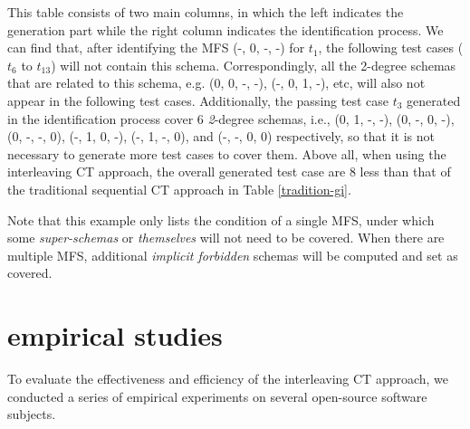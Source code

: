 \documentclass{sig-alternate}
\begin{document}
This table consists of two main columns, in which the left indicates the generation part while the right column indicates the identification process. We can find that, after identifying the MFS (-, 0, -, -) for $t_{1}$, the following test cases ($t_{6}$ to $t_{13}$) will not contain this schema. Correspondingly, all the 2-degree schemas that are related to this schema, e.g. (0, 0, -, -), (-, 0, 1, -), etc, will also not appear in the following test cases. Additionally, the passing test case $t_{3}$ generated in the identification process cover 6 \emph{2}-degree schemas, i.e., (0, 1, -, -), (0, -, 0, -), (0, -, -, 0), (-, 1, 0, -), (-, 1, -, 0), and (-, -, 0, 0) respectively, so that it is not necessary to generate more test cases to cover them.  Above all, when using the interleaving CT approach,  the overall generated test case are 8 less than that of the traditional sequential CT approach in Table \ref{tradition-gi}.

Note that this example only lists the condition of a single MFS, under which some \emph{super-schemas} or \emph{themselves} will not need to be covered.  When there are multiple MFS, additional \emph{implicit forbidden} schemas will be computed and set as covered.



%
%

\section{empirical studies}
To evaluate the effectiveness and efficiency of the interleaving CT approach, we conducted a series of empirical experiments on several open-source software subjects.
\end{document}

